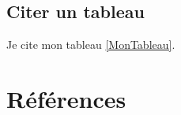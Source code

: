 \documentclass[11pt,a4paper]{article}
\begin{document}
\subsection{Citer un tableau}
Je cite mon tableau \ref{MonTableau}.


\section{Références}
%
\end{document}
